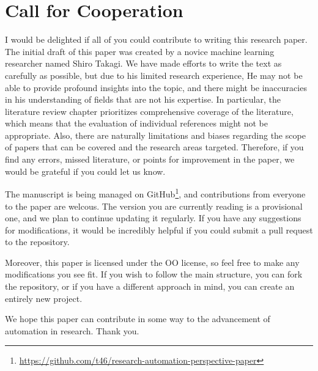 \documentclass{book}
\begin{document}
\section{Call for Cooperation}
I would be delighted if all of you could contribute to writing this research paper. The initial draft of this paper was created by a novice machine learning researcher named Shiro Takagi. We have made efforts to write the text as carefully as possible, but due to his limited research experience, He may not be able to provide profound insights into the topic, and there might be inaccuracies in his understanding of fields that are not his expertise. In particular, the literature review chapter prioritizes comprehensive coverage of the literature, which means that the evaluation of individual references might not be appropriate. Also, there are naturally limitations and biases regarding the scope of papers that can be covered and the research areas targeted. Therefore, if you find any errors, missed literature, or points for improvement in the paper, we would be grateful if you could let us know.

The manuscript is being managed on GitHub\footnote{\url{https://github.com/t46/research-automation-perspective-paper}}, and contributions from everyone to the paper are welcous. The version you are currently reading is a provisional one, and we plan to continue updating it regularly. If you have any suggestions for modifications, it would be incredibly helpful if you could submit a pull request to the repository.

Moreover, this paper is licensed under the OO license, so feel free to make any modifications you see fit. If you wish to follow the main structure, you can fork the repository, or if you have a different approach in mind, you can create an entirely new project.

We hope this paper can contribute in some way to the advancement of automation in research. Thank you.




\end{document}
